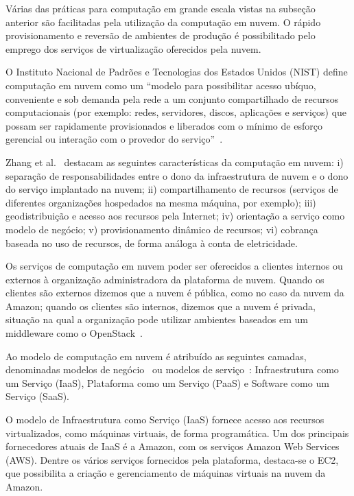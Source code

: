 Várias das práticas para computação em grande escala vistas na subseção anterior são facilitadas pela utilização da computação em nuvem. O rápido provisionamento e reversão de ambientes de produção é possibilitado pelo emprego dos serviços de virtualização oferecidos pela nuvem.

O Instituto Nacional de Padrões e Tecnologias dos Estados Unidos (NIST) define computação em nuvem como um ``modelo para possibilitar acesso ubíquo, conveniente e sob demanda pela rede a um conjunto compartilhado de recursos computacionais (por exemplo: redes, servidores, discos, aplicações e serviços) que possam ser rapidamente provisionados e liberados com o mínimo de esforço gerencial ou interação com o provedor do serviço''~\cite{Nist2011Cloud}. 

Zhang et al.~\cite{Zhang2010Cloud} destacam as seguintes características da computação em nuvem: i) separação de responsabilidades entre o dono da infraestrutura de nuvem e o dono do serviço implantado na nuvem; ii) compartilhamento de recursos (serviços de diferentes organizações hospedados na mesma máquina, por exemplo); iii) geodistribuição e acesso aos recursos pela Internet; iv) orientação a serviço como modelo de negócio; v) provisionamento dinâmico de recursos; vi) cobrança baseada no uso de recursos, de forma análoga à conta de eletricidade.

Os serviços de computação em nuvem poder ser oferecidos a clientes internos ou externos à organização administradora da plataforma de nuvem. Quando os clientes são externos dizemos que a nuvem é pública, como no caso da nuvem da Amazon; quando os clientes são internos, dizemos que a nuvem é privada, situação na qual a organização pode utilizar ambientes baseados em um middleware como o OpenStack~\cite{Zhang2010Cloud}.

Ao modelo de computação em nuvem é atribuído as seguintes camadas, denominadas modelos de negócio~\cite{Zhang2010Cloud} ou modelos de serviço~\cite{Nist2011Cloud}: Infraestrutura como um Serviço (IaaS), Plataforma como um Serviço (PaaS) e Software como um Serviço (SaaS). 

O modelo de Infraestrutura como Serviço (IaaS) fornece acesso aos recursos virtualizados, como máquinas virtuais, de forma programática. Um dos principais fornecedores atuais de IaaS é a Amazon, com os serviços Amazon Web Services (AWS). Dentre os vários serviços fornecidos pela plataforma, destaca-se o EC2, que possibilita a criação e gerenciamento de máquinas virtuais na nuvem da Amazon.


